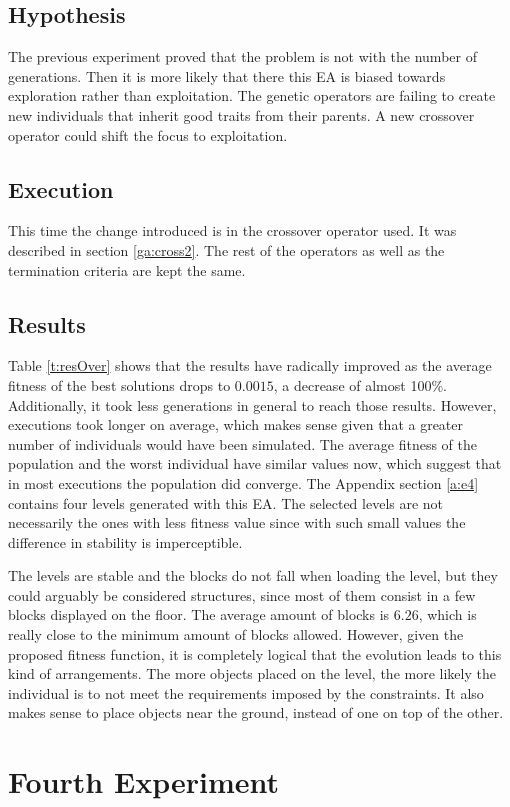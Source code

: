 \subsection{Hypothesis}
The previous experiment proved that the problem is not with the number of generations. Then it is more likely that there this \acs{EA} is biased towards exploration rather than exploitation. The genetic operators are failing to create new individuals that inherit good traits from their parents. A new crossover operator could shift the focus to exploitation.
\subsection{Execution}
This time the change introduced is in the crossover operator used. It was described in section \ref{ga:cross2}. The rest of the operators as well as the termination criteria are kept the same. 
\subsection{Results}
Table \ref{t:resOver} shows that the results have radically improved as the average fitness of the best solutions drops to $0.0015$, a decrease of almost 100\%. Additionally, it took less generations in general to reach those results. However, executions took longer on average, which makes sense given that a greater number of individuals would have been simulated. The average fitness of the population and the worst individual have similar values now, which suggest that in most executions the population did converge. The Appendix section \ref{a:e4} contains four levels generated with this \acs{EA}. The selected levels are not necessarily the ones with less fitness value since with such small values the difference in stability is imperceptible.

The levels are stable and the blocks do not fall when loading the level, but they could arguably be considered structures, since most of them consist in a few blocks displayed on the floor. The average amount of blocks is $6.26$, which is really close to the minimum amount of blocks allowed. However, given the proposed fitness function, it is completely logical that the evolution leads to this kind of arrangements. The more objects placed on the level, the more likely the individual is to not meet the requirements imposed by the constraints. It also makes sense to place objects near the ground, instead of one on top of the other.

\section{Fourth Experiment}
